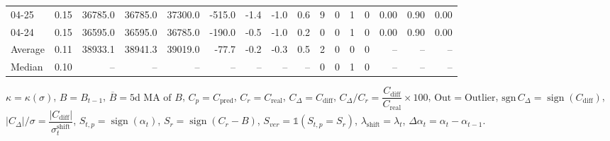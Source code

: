 \begin{threeparttable}
{\begin{tabular}{lrrrrrrrrrrrrrrr}
  04-25 &     0.15 & 36785.0 & 36785.0 & 37300.0 &     -515.0 &           -1.4 &                     -1.0 &                 0.6 &              9 &         0 &     1 &         0 &       0.00 &      0.90 &           0.00 \\
  04-24 &     0.15 & 36595.0 & 36595.0 & 36785.0 &     -190.0 &           -0.5 &                     -1.0 &                 0.2 &              0 &         0 &     1 &         0 &       0.00 &      0.90 &           0.00 \\
Average &     0.11 & 38933.1 & 38941.3 & 39019.0 &      -77.7 &           -0.2 &                     -0.3 &                 0.5 &              2 &         0 &     0 &         0 &         -- &        -- &             -- \\
 Median &     0.10 &      -- &      -- &      -- &         -- &             -- &                       -- &                  -- &              0 &         0 &     1 &         0 &         -- &        -- &             -- \\
\bottomrule
\end{tabular}
}
\begin{tablenotes}\footnotesize
\item $\kappa=\kappa(\sigma)$, $B=B_{t-1}$, $\overline{B}=\text{5d MA of }B$, $C_p=C_{\text{pred}}$, $C_r=C_{\text{real}}$, $C_\Delta=C_{\text{diff}}$, $C_\Delta/C_r=\dfrac{C_{\text{diff}}}{C_{\text{real}}}\times100$, $\mathrm{Out}=\text{Outlier}$, $\mathrm{sgn}\,C_\Delta=\operatorname{sign}(C_{\text{diff}})$, $|C_\Delta|/\sigma=\dfrac{|C_{\text{diff}}|}{\sigma_t^{\text{shift}}}$, $S_{t,p}=\operatorname{sign}(\alpha_t)$, $S_r=\operatorname{sign}(C_r - B)$, $S_{ver}=\mathbb{1}(S_{t,p}=S_r)$, $\lambda_{\text{shift}}=\lambda_t$, $\Delta\alpha_t=\alpha_t-\alpha_{t-1}$.\end{tablenotes}
\end{threeparttable}
\endgroup

